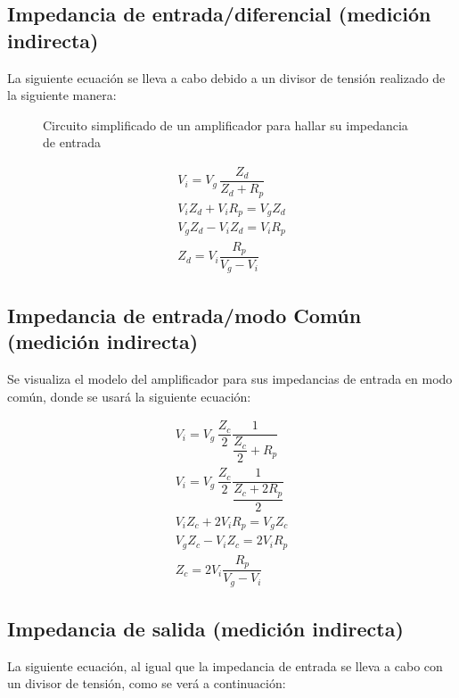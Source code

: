 \subsection{Impedancia de entrada/diferencial (medición indirecta)}

La siguiente ecuación se lleva a cabo debido a un divisor de tensión realizado de la siguiente manera:

\begin{figure}[H]
    \centering
    
    \caption{Circuito simplificado de un amplificador para hallar su impedancia de entrada}
    \label{fig:zin_amp}
\end{figure}

\begin{gather}
    V_i=V_g \, \dfrac{Z_{d}}{Z_{d}+R_p} \nonumber \\[0.2cm]
    V_iZ_{d}+V_iR_p = V_gZ_{d} \nonumber \\[0.2cm]
    V_gZ_{d} - V_iZ_{d} = V_iR_p  \nonumber \\[0.2cm]
    Z_{d} = V_i \dfrac{R_p}{V_g-V_i}  \label{eqn:zin}
\end{gather}

\subsection{Impedancia de entrada/modo Común (medición indirecta)}

Se visualiza el modelo del amplificador para sus impedancias de entrada en modo común, donde se usará la siguiente ecuación:

\begin{gather}
    V_i=V_g \,\dfrac{Z_{c}}{2} \dfrac{1}{\dfrac{Z_{c}}{2}+R_p} \nonumber \\[0.2cm]
    V_i=V_g \, \dfrac{Z_{c}}{2} \dfrac{1}{\dfrac{Z_{c}+2R_p}{2}} \nonumber \\[0.2cm]
    V_iZ_{c}+2V_iR_p = V_gZ_{c} \nonumber \\[0.2cm]
    V_gZ_{c} - V_iZ_{c} = 2V_iR_p  \nonumber \\[0.2cm]
    Z_{c} = 2V_i \dfrac{R_p}{V_g-V_i}  \label{eqn:zc}
\end{gather}

\subsection{Impedancia de salida (medición indirecta)}

La siguiente ecuación, al igual que la impedancia de entrada se lleva a cabo con un divisor de tensión, como se verá a continuación:

